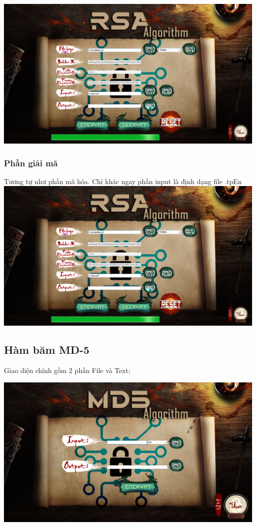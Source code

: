 \documentclass[paper=a4, fontsize=11pt]{scrartcl}	%
\numberwithin{equation}{section}															%
\numberwithin{figure}{section}																%
\numberwithin{table}{section}																%
\begin{document}
	    \includegraphics[scale = 0.4]{RSA_END}

		\subsubsection{Phần giải mã}
		Tương tự như phần mã hóa. Chỉ khác ngay phần input là định dạng file .tpEn \\
		
		 \includegraphics[scale = 0.4]{RSA_END}
		
	\subsection{Hàm băm MD-5}
	Giao diện chính gồm 2 phần File và Text:
	\begin{center}
		\includegraphics[scale=0.4]{MD5GIAODIEN}
	\end{center}
	
\end{document}
